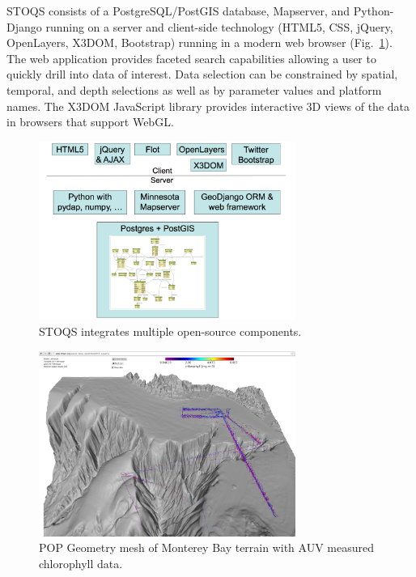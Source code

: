 \documentclass[annualconference]{acmsiggraph}  %
\begin{document}
STOQS consists of a PostgreSQL/PostGIS database, Mapserver, and Python-Django running on a server and client-side technology (HTML5, CSS, jQuery, OpenLayers, X3DOM, Bootstrap) running in a modern web browser (Fig.~\ref{fig:STOQSArch}). The web application provides faceted search capabilities allowing a user to quickly drill into data of interest. Data selection can be constrained by spatial, temporal, and depth selections as well as by parameter values and platform names. The X3DOM JavaScript library provides interactive 3D views of the data in browsers that support WebGL.  

\begin{figure}[htbp]
\centering
\includegraphics[width=3.3in]{STOQS_Architecture_withX3DOM.png}
\caption{STOQS integrates multiple open-source components.}
\label{fig:STOQSArch}
\end{figure}




\begin{figure}[htbp]
\centering
\includegraphics[width=3.3in]{Monterey25_lrauvs.png}
\caption{POP Geometry mesh of Monterey Bay terrain with AUV measured chlorophyll data.}
\label{fig:Monterey25_lrauvs}
\end{figure}
\end{document}
